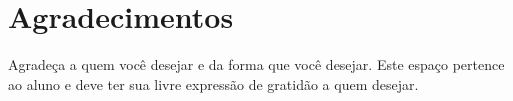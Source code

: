 \chapter*{Agradecimentos}

Agradeça a quem você desejar e da forma que você desejar. Este espaço pertence ao aluno e deve ter sua livre expressão de gratidão a quem desejar.